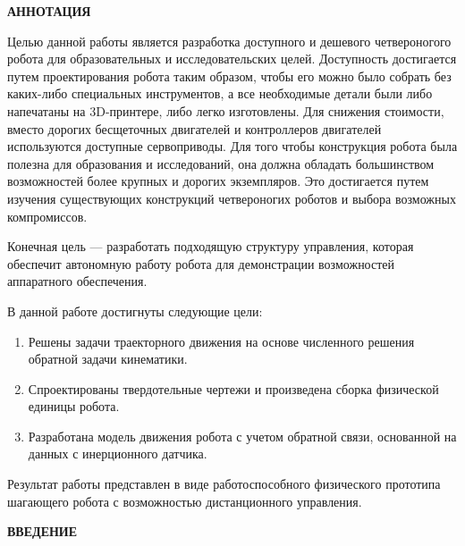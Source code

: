 
\newpage
{}
\begin{center}
	\textbf{АННОТАЦИЯ} 
\end{center}

Целью данной работы является разработка доступного и дешевого четвероногого робота для образовательных и исследовательских целей. Доступность достигается путем проектирования робота таким образом, чтобы его можно было собрать без каких-либо специальных инструментов, а все необходимые детали были либо напечатаны на 3D-принтере, либо легко изготовлены. Для снижения стоимости, вместо дорогих бесщеточных двигателей и контроллеров двигателей используются доступные сервоприводы. Для того чтобы конструкция робота была полезна для образования и исследований, она должна обладать большинством возможностей более крупных и дорогих экземпляров. Это достигается путем изучения существующих конструкций четвероногих роботов и выбора возможных компромиссов.

Конечная цель --- разработать подходящую структуру управления, которая обеспечит автономную работу робота для демонстрации возможностей аппаратного обеспечения.

В данной работе достигнуты следующие цели:
\begin{enumerate} 
	\item Решены задачи траекторного движения на основе численного решения обратной задачи кинематики.
	\item Спроектированы твердотельные чертежи и произведена сборка физической единицы робота.
	\item Разработана модель движения робота с учетом обратной связи, основанной на данных с инерционного датчика.
\end{enumerate}
Результат работы представлен в виде работоспособного физического прототипа шагающего робота с возможностью дистанционного управления.


\onehalfspacing
\setcounter{page}{6}
\renewcommand{\contentsname}{\centerline{\Large{Cодержание}}}
\tableofcontents
{}
\renewcommand{\contentsname}{\centerline{\Large{Cодержание}}}

\newpage
\begin{center}
	\textbf{ВВЕДЕНИЕ}
\end{center}

